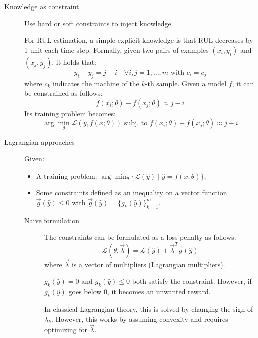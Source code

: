 \begin{description}
    \item[Knowledge as constraint] 
        Use hard or soft constraints to inject knowledge.

        \begin{example}
            For RUL estimation, a simple explicit knowledge is that RUL decreases by 1 unit each time step. Formally, given two pairs of examples $(x_i, y_i)$ and $(x_j, y_j)$, it holds that:
            \[ y_i - y_j = j - i \quad \forall i,j = 1, \dots, m \text{ with } c_i = c_j \]
            where $c_k$ indicates the machine of the $k$-th sample.
            Given a model $f$, it can be constrained as follows:
            \[ f(x_i; \theta) - f(x_j; \theta) \approx j - i \]
            Its training problem becomes:
            \[ \arg\min_\theta \mathcal{L}(y, f(x; \theta)) \text{ subj. to } f(x_i; \theta) - f(x_j; \theta) \approx j - i \]
        \end{example}


    \item[Lagrangian approaches] 
        Given:
        \begin{itemize}
            \item A training problem: $\arg\min_\theta \{ \mathcal{L}(\hat{y}) \mid \hat{y} = f(x; \theta) \}$,
            \item Some constraints defined as an inequality on a vector function $\vec{g}(\hat{y}) \leq 0$ with $\vec{g}(\hat{y}) = \{ g_k(\hat{y}) \}_{k=1}^{m}$.
        \end{itemize}

        \begin{description}
            \item[Naive formulation] 
                The constraints can be formulated as a loss penalty as follows:
                \[ \mathcal{L}(\theta, \vec{\lambda}) = \mathcal{L}(\hat{y}) + \vec{\lambda}^T \vec{g}(\hat{y}) \]
                where $\vec{\lambda}$ is a vector of multipliers (Lagrangian multipliers).

                \begin{remark}
                    $g_k(\hat{y}) = 0$ and $g_k(\hat{y}) \leq 0$ both satisfy the constraint. However, if $g_k(\hat{y})$ goes below $0$, it becomes an unwanted reward.

                    In classical Lagrangian theory, this is solved by changing the sign of $\lambda_k$. However, this works by assuming convexity and requires optimizing for $\vec{\lambda}$.
                \end{remark}


\end{description}
\end{description}
